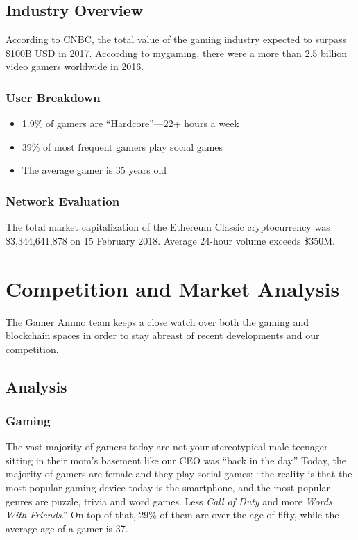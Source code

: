 \documentclass[11pt]{report}
\begin{document}
\section{Industry Overview}
According to CNBC, the total value of the gaming industry expected to surpass \$100B USD in 2017.\cite{CNBC-gaming-market} According to mygaming, there were a more than 2.5 billion video gamers worldwide in 2016.\cite{number-of-gamers}
\subsection{User Breakdown}
\begin{itemize}
\item 1.9\% of gamers are “Hardcore”---22+ hours a week
\item 39\% of most frequent gamers play social games
\item The average gamer is 35 years old
\end{itemize}
\subsection{Network Evaluation}
The total market capitalization of the Ethereum Classic cryptocurrency was \$3,344,641,878 on 15 February 2018. Average 24-hour volume exceeds \$350M.\cite{ETC-market-data}\cite{worldcoin-ETC-market-data}
\chapter{Competition and Market Analysis}
The Gamer Ammo team keeps a close watch over both the gaming and blockchain spaces in order to stay abreast of recent developments and our competition.
\section{Analysis}
\subsection{Gaming}
The vast majority of gamers today are not your stereotypical male teenager sitting in their mom's basement like our CEO was ``back in the day.'' Today, the majority of gamers are female and they play social games: ``the reality is that the most popular gaming device today is the smartphone, and the most popular genres are puzzle, trivia and word games. Less \textit{Call of Duty} and more \textit{Words With Friends}.''\cite{female-gamers} On top of that, 29\% of them are over the age of fifty, while the average age of a gamer is 37.\cite{average-gamer-age}
\end{document}
